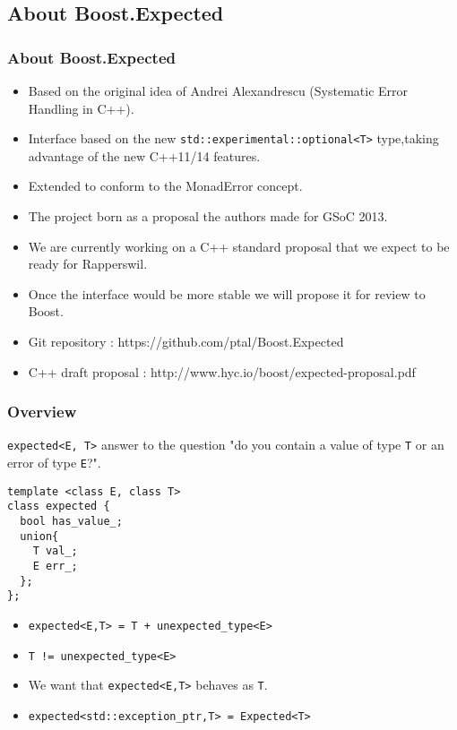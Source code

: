 \documentclass[xcolor=dvipsnames]{beamer}
\newcommand{\cpp}[1]{\lstinline{#1}}
\begin{document}
\subsection{About Boost.Expected}
\begin{frame}
\frametitle{About Boost.Expected}

\begin{itemize}
\item Based on the original idea of Andrei Alexandrescu (Systematic Error Handling in C++).
\item Interface based on the new \cpp{std::experimental::optional<T>} type,taking advantage of the new C++11/14 features.
\item Extended to conform to the MonadError concept.
\item The project born as a proposal the authors made for GSoC 2013.
\item We are currently working on a C++ standard proposal that we expect to be ready for Rapperswil.
\item Once the interface would be more stable we will propose it for review to Boost.
\end{itemize}

\begin{itemize}
\item Git repository : https://github.com/ptal/Boost.Expected
\item C++ draft proposal : http://www.hyc.io/boost/expected-proposal.pdf
\end{itemize}
\end{frame}
\begin{frame}[fragile]
\frametitle{Overview}

\cpp{expected<E, T>} answer to the question "do you contain a value of type \cpp{T} or an error of type \cpp{E}?".

\begin{lstlisting}
template <class E, class T>
class expected {
  bool has_value_;
  union{ 
    T val_;
    E err_;
  };
};
\end{lstlisting}

\begin{itemize}
\item \cpp{expected<E,T> = T + unexpected_type<E>}
\item \cpp{T != unexpected_type<E>}
\item We want that \cpp{expected<E,T>} behaves as \cpp{T}.
\item \cpp{expected<std::exception_ptr,T> = Expected<T>}
\end{itemize}

\end{frame}
\end{document}
